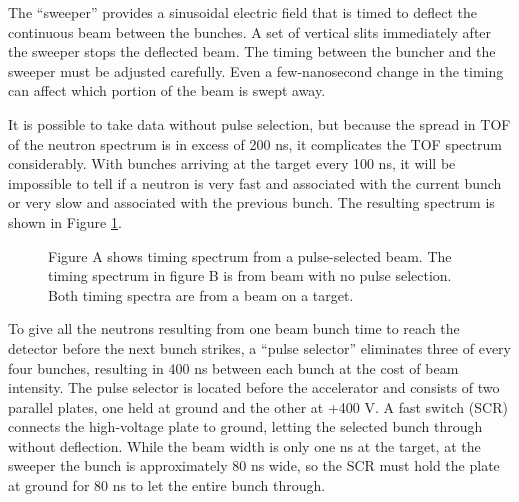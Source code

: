 The ``sweeper'' provides a sinusoidal electric field that is timed to deflect the continuous beam between the bunches.  A set of vertical slits immediately after the sweeper stops the deflected beam.  The timing between the buncher and the sweeper must be adjusted carefully.  Even a few-nanosecond change in the timing can affect which portion of the beam is swept away. 


It is possible to take data without pulse selection, but because the spread in TOF of the neutron spectrum is in excess of 200 ns, it complicates the TOF spectrum considerably.  With bunches arriving at the target every 100 ns, it will be impossible to tell if a neutron is very fast and associated with the current bunch or very slow and associated with the previous bunch.  The resulting spectrum is shown in Figure \ref{fig:PSvsNPS_TOF}.

\begin{figure}[htp]
\centering
{}
\label{fig:PSvsNPS_TOF}
\caption{Figure A shows timing spectrum from a pulse-selected beam.  The timing spectrum in figure B is from beam with no pulse selection.  Both timing spectra are from a  beam on a  target.}
\end{figure}

To give all the neutrons resulting from one beam bunch time to reach the detector before the next bunch strikes, a ``pulse selector'' eliminates three of every four bunches, resulting in 400 ns between each bunch at the cost of beam intensity.  The pulse selector is located before the accelerator and consists of two parallel plates, one held at ground and the other at +400 V.  A fast switch (SCR) connects the high-voltage plate to ground, letting the selected bunch through without deflection.  While the beam width is only one ns at the target, at the sweeper the bunch is approximately 80 ns wide, so the SCR must hold the plate at ground for 80 ns to let the entire bunch through.


